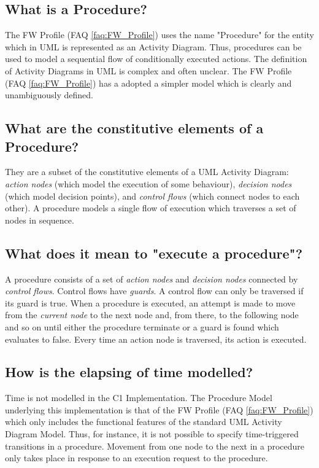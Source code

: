 \documentclass[faq]{../fwprofile}
\begin{document}
\subsection{What is a Procedure?}
The FW Profile (FAQ \ref{faq:FW_Profile}) uses the name "Procedure" for the entity which in UML is represented as an Activity Diagram. Thus, procedures can be used 
to model a sequential flow of conditionally executed actions. The definition of Activity Diagrams in UML is complex and often unclear. 
The FW Profile (FAQ \ref{faq:FW_Profile}) has a adopted a simpler model which is clearly and unambiguously defined.

\subsection{What are the constitutive elements of a Procedure?}
They are a subset of the constitutive elements of a UML Activity Diagram: \emph{action nodes} (which model the execution of some behaviour), 
\emph{decision nodes} (which model decision points), and \emph{control flows} (which connect nodes to each other). A procedure models a single flow of 
execution which traverses a set of nodes in sequence.

\subsection{What does it mean to "execute a procedure"?}\label{faq:PR_Execution}
A procedure consists of a set of \emph{action nodes} and \emph{decision nodes} connected by \emph{control flows}. Control flows have \emph{guards}. 
A control flow can only be traversed if its guard is true. When a procedure is executed, an attempt is made to move from the \emph{current node} 
to the next node and, from there, to the following node and so on until either the procedure terminate or a guard is found which evaluates to false. 
Every time an action node is traversed, its action is executed. 

\subsection{How is the elapsing of time modelled?}
Time is not modelled in the C1 Implementation. The Procedure Model underlying this implementation is that of the FW Profile (FAQ \ref{faq:FW_Profile}) which only 
includes the functional features of the standard UML Activity Diagram Model. Thus, for instance, it is not possible to specify time-triggered transitions 
in a procedure. Movement from one node to the next in a procedure only takes place in response to an execution request to the procedure. 
\end{document}
